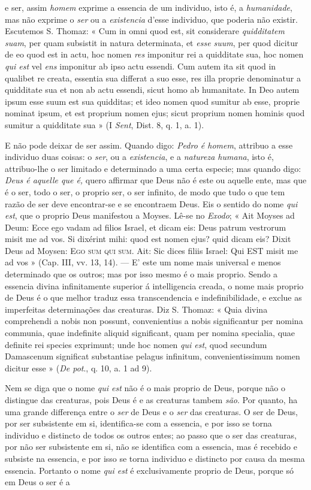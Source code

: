 e ser, assim \emph{homem} exprime a essencia de um individuo, isto é, a \emph{humanidade}, mas não exprime o \emph{ser} ou a \emph{existencia} d'esse individuo, que poderia não existir. Escutemos S. Thomaz: « Cum in omni quod est, sit considerare \emph{quidditatem suam}, per quam subsistit in natura determinata, et \emph{esse suum}, per quod dicitur de eo quod est in actu, hoc nomen \emph{res} imponitur rei a quidditate sua, hoc nomen \emph{qui est} vel \emph{ens} imponitur ab ipso actu essendi. Cum autem ita sit quod in qualibet re creata, essentia sua differat a suo esse, res illa proprie denominatur a quidditate sua et non ab actu essendi, sicut homo ab humanitate. In Deo autem ipsum esse suum est sua quidditas; et ideo nomen quod sumitur ab esse, proprie nominat ipsum, et est proprium nomen ejus; sicut proprium nomen hominis quod sumitur a quidditate sua » (I \emph{Sent}, Dist. 8, q. 1, a. 1).\par E não pode deixar de ser assim. Quando digo: \emph{Pedro é homem}, attribuo a esse individuo duas coisas: o \emph{ser}, ou a \emph{existencia}, e a \emph{natureza humana}, isto é, attribuo-lhe o ser limitado e determinado a uma certa especie; mas quando digo: \emph{Deus é aquelle que é,} quero affirmar que Deus não é este ou aquelle ente, mas que é o ser, todo o ser, o proprio ser, o ser infinito, de modo que tudo o que tem razão de ser deve encontrar-se e se encontraem Deus. Eis o sentido do nome \emph{qui est}, que o proprio Deus manifestou a Moyses. Lê-se no \emph{Exodo}; « Ait Moyses ad Deum: Ecce ego vadam ad filios Israel, et dicam eis: Deus patrum vestrorum misit me ad vos. Si dixérint mihi: quod est nomen ejus? quid dicam eis? Dixit Deus ad Moysen: \textsc{Ego sum qui sum}. Ait: Sic dices filiis Israel: Qui EST misit me ad vos » (Cap. III, vv. 13, 14). --- E' este um nome mais universal e menos determinado que os outros; mas por isso mesmo é o mais proprio. Sendo a essencia divina infinitamente superior á intelligencia creada, o nome mais proprio de Deus é o que melhor traduz essa transcendencia e indefinibilidade, e exclue as imperfeitas determinações das creaturas. Diz S. Thomaz: « Quia divina comprehendi a nobis non possunt, convenientius a nobis significantur per nomina communia, quae indefinite aliquid significant, quam per nomina specialia, quae definite rei species exprimunt; unde hoc nomen \emph{qui est}, quod secundum Damascenum significat substantiae pelagus infinitum, convenientissimum nomen dicitur esse » (\emph{De pot}., q. 10, a. 1 ad 9).\par Nem se diga que o nome \emph{qui est} não é o mais proprio de Deus, porque não o distingue das creaturas, pois Deus é e as creaturas tambem \emph{são}. Por quanto, ha uma grande differença entre o \emph{ser} de Deus e o \emph{ser} das creaturas. O ser de Deus, por ser subsistente em si, identifica-se com a essencia, e por isso se torna individuo e distincto de todos os outros entes; ao passo que o ser das creaturas, por não ser subsistente em si, não se identifica com a essencia, mas é recebido e subsiste na essencia, e por isso se torna individuo e distincto por causa da mesma essencia. Portanto o nome \emph{qui est} é exclusivamente proprio de Deus, porque só em Deus o ser é a 